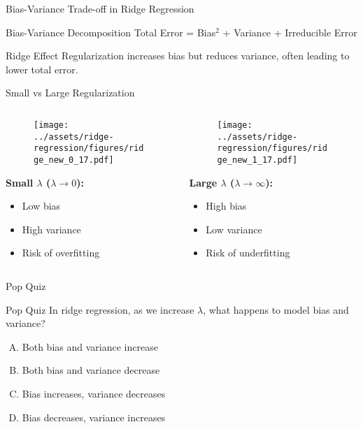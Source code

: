 \documentclass{beamer}
\begin{document}
\begin{frame}{Bias-Variance Trade-off in Ridge Regression}
\begin{theorembox}{Bias-Variance Decomposition}
Total Error = Bias$^2$ + Variance + Irreducible Error
\end{theorembox}
\pause

\begin{keypointsbox}{Ridge Effect}
Regularization increases bias but reduces variance, often leading to lower total error.
\end{keypointsbox}
\end{frame}

\begin{frame}{Small vs Large Regularization}
\begin{columns}
\begin{column}{0.48\textwidth}
\begin{figure}
\texttt{[image: ../assets/ridge-regression/figures/ridge\_new\_0\_17.pdf]}
\end{figure}
\textbf{Small $\lambda$ ($\lambda \to 0$):}
\begin{itemize}
\item Low bias
\item High variance
\item Risk of overfitting
\end{itemize}
\end{column}
\begin{column}{0.48\textwidth}
\begin{figure}
\texttt{[image: ../assets/ridge-regression/figures/ridge\_new\_1\_17.pdf]}
\end{figure}
\textbf{Large $\lambda$ ($\lambda \to \infty$):}
\begin{itemize}
\item High bias
\item Low variance  
\item Risk of underfitting
\end{itemize}
\end{column}
\end{columns}
\end{frame}

\begin{frame}{Pop Quiz \thepopquiz}
\begin{popquizbox}{Pop Quiz \thepopquiz}
In ridge regression, as we increase $\lambda$, what happens to model bias and variance?
\begin{enumerate}[A)]
\item Both bias and variance increase
\item Both bias and variance decrease
\item Bias increases, variance decreases
\item Bias decreases, variance increases
\end{enumerate}
\end{popquizbox}
\end{frame}
\end{document}
